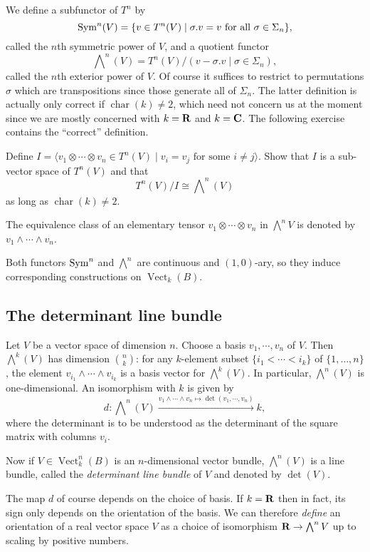 \documentclass[a4paper,openany]{scrbook}
\DeclareMathOperator{\Vect}{Vect}
\DeclareMathOperator{\chr}{char}
\newcommand{\exterior}{\bigwedge\nolimits}
\begin{document}
We define a subfunctor of $T^n$ by
\[
\operatorname{Sym}^n(V) = \{v \in T^n(V) \mid \sigma.v=v \text{ for all } \sigma \in \Sigma_n\},
\]
called the $n$th symmetric power of $V$, and a quotient functor
\[
\exterior^n(V) = T^n(V)/(v-\sigma.v\mid \sigma \in \Sigma_n),
\]
called the $n$th exterior power of $V$. Of course it suffices to restrict to permutations $\sigma$ which are transpositions since those generate all of $\Sigma_n$. The latter definition is actually only correct if $\chr(k) \neq 2$, which need not concern us at the moment since we are mostly concerned with $k=\mathbf R$ and $k=\mathbf C$. The following exercise contains the ``correct'' definition.

\begin{exer}
Define $I = \langle v_1 \otimes \cdots \otimes v_n \in T^n(V) \mid v_i=v_j \text{ for some }i\neq j\rangle$. Show that $I$ is a sub-vector space of $T^n(V)$ and that
\[
T^n(V)/I \cong \exterior^n(V)
\]
as long as $\chr(k) \neq 2$.
\end{exer}

The equivalence class of an elementary tensor $v_1 \otimes \cdots \otimes v_n$ in $\exterior^nV$ is denoted by $v_1 \wedge \cdots \wedge v_n$. 

Both functors $\operatorname{Sym}^n$ and $\exterior^n$ are continuous and $(1,0)$-ary, so they induce corresponding constructions on $\Vect_k(B)$.

\subsection{The determinant line bundle}

Let $V$ be a vector space of dimension $n$. Choose a basis $v_1,\cdots,v_n$ of $V$. Then $\exterior^k(V)$ has dimension $n \choose k$: for any $k$-element subset $\{i_1<\cdots<i_k\}$ of $\{1,\dots,n\}$, the element $v_{i_1} \wedge \cdots \wedge v_{i_k}$ is a basis vector for $\exterior^k(V)$. In particular, $\exterior^n(V)$ is one-dimensional. An isomorphism with $k$ is given by
\[
d\colon \exterior^n(V) \xrightarrow{v_1 \wedge \cdots \wedge v_n \mapsto \det(v_1,\cdots,v_n)} k,
\]
where the determinant is to be understood as the determinant of the square matrix with columns $v_i$. 

Now if $V \in \Vect^n_k(B)$ is an $n$-dimensional vector bundle, $\exterior^n(V)$ is a line bundle, called the \emph{determinant line bundle} of $V$ and denoted by $\det(V)$.

The map $d$ of course depends on the choice of basis. If $k=\mathbf R$ then in fact, its sign only depends on the orientation of the basis. We can therefore \emph{define} an orientation of a real vector space $V$ as a choice of isomorphism $\R \to \exterior^nV$ up to scaling by positive numbers.
\end{document}
